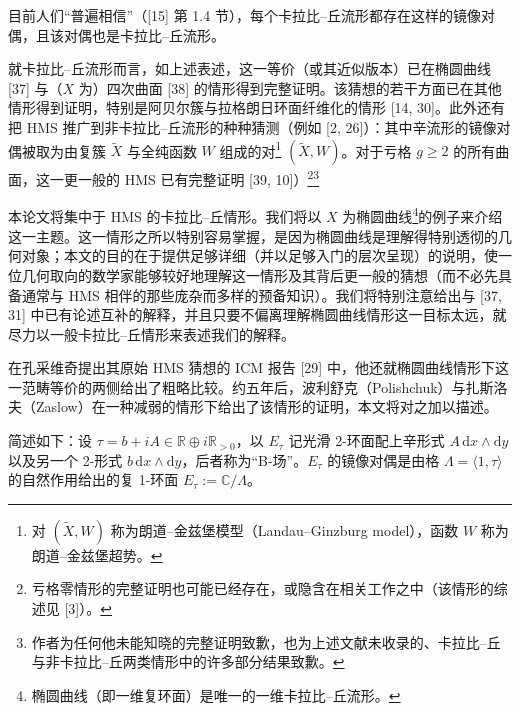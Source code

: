 \documentclass[11pt,a4paper]{article}
\theoremstyle{plain}
\theoremstyle{definition}
\begin{document}
目前人们“普遍相信”（[15] 第 1.4 节），每个卡拉比–丘流形都存在这样的镜像对偶，且该对偶也是卡拉比–丘流形。

就卡拉比–丘流形而言，如上述表述，这一等价（或其近似版本）已在椭圆曲线 [37] 与（$X$ 为）四次曲面 [38] 的情形得到完整证明。该猜想的若干方面已在其他情形得到证明，特别是阿贝尔簇与拉格朗日环面纤维化的情形 [14, 30]。此外还有把 HMS 推广到非卡拉比–丘流形的种种猜测（例如 [2, 26]）：其中辛流形的镜像对偶被取为由复簇 $\tilde X$ 与全纯函数 $W$ 组成的对\footnote{对 $(\tilde X,W)$ 称为朗道–金兹堡模型（Landau--Ginzburg model），函数 $W$ 称为朗道–金兹堡超势。} $(\tilde X,W)$。对于亏格 $g\ge 2$ 的所有曲面，这一更一般的 HMS 已有完整证明 [39, 10]）\footnote{亏格零情形的完整证明也可能已经存在，或隐含在相关工作之中（该情形的综述见 [3]）。}\footnote{作者为任何他未能知晓的完整证明致歉，也为上述文献未收录的、卡拉比–丘与非卡拉比–丘两类情形中的许多部分结果致歉。}

本论文将集中于 HMS 的卡拉比–丘情形。我们将以 $X$ 为椭圆曲线\footnote{椭圆曲线（即一维复环面）是唯一的一维卡拉比–丘流形。}的例子来介绍这一主题。这一情形之所以特别容易掌握，是因为椭圆曲线是理解得特别透彻的几何对象；本文的目的在于提供足够详细（并以足够入门的层次呈现）的说明，使一位几何取向的数学家能够较好地理解这一情形及其背后更一般的猜想（而不必先具备通常与 HMS 相伴的那些庞杂而多样的预备知识）。我们将特别注意给出与 [37, 31] 中已有论述互补的解释，并且只要不偏离理解椭圆曲线情形这一目标太远，就尽力以一般卡拉比–丘情形来表述我们的解释。

在孔采维奇提出其原始 HMS 猜想的 ICM 报告 [29] 中，他还就椭圆曲线情形下这一范畴等价的两侧给出了粗略比较。约五年后，波利舒克（Polishchuk）与扎斯洛夫（Zaslow）在一种减弱的情形下给出了该情形的证明，本文将对之加以描述。

简述如下：设 $\tau=b+iA\in\mathbb{R}\oplus i\mathbb{R}_{>0}$，以 $E_\tau$ 记光滑 2-环面配上辛形式 $A\,\mathrm{d}x\wedge\mathrm{d}y$ 以及另一个 2-形式 $b\,\mathrm{d}x\wedge\mathrm{d}y$，后者称为“B-场”。$E_\tau$ 的镜像对偶是由格 $\Lambda=\langle 1,\tau\rangle$ 的自然作用给出的复 1-环面 $E_\tau:=\mathbb{C}/\Lambda$。
\end{document}
